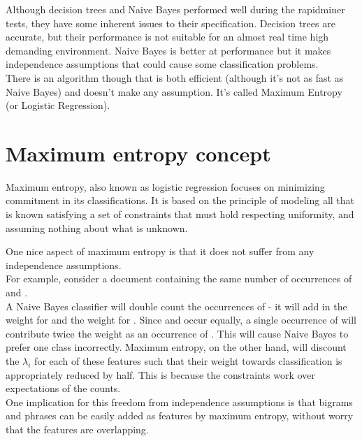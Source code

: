 Although decision trees and Naive Bayes performed well during the rapidminer tests, they have some inherent issues to their specification. Decision trees are accurate, but their performance is 
not suitable for an almost real time high demanding environment. Naive Bayes is better at performance but it makes independence assumptions that could cause some classification problems.\\
There is an algorithm though that is both efficient (although it's not as fast as Naive Bayes) and doesn't make any assumption. It's called Maximum Entropy (or Logistic Regression).

\section{Maximum entropy concept}
Maximum entropy, also known as logistic regression focuses on minimizing commitment in its classifications. It is based on the principle of modeling all that is known satisfying a set of constraints
that must hold respecting uniformity, and assuming nothing about what is unknown.

One nice aspect of maximum entropy is that it does not suffer from any independence assumptions.\\
For example, consider a document containing the same number of occurrences of  and .\\
A Naive Bayes classifier will double count the occurrences of  
- it will add in the weight for  and the weight for . Since  and
 occur equally, a single occurrence of  will contribute twice the weight as an occurrence of . This will cause Naive Bayes to prefer one class 
incorrectly.
Maximum entropy, on the other hand, will discount the $\lambda_i$ for each of these features such that their weight towards classification is appropriately reduced by half.
This is because the constraints work over expectations of the counts. \\
One implication for this freedom from independence assumptions is that bigrams and phrases can be easily added as features by maximum entropy, without worry that the features are overlapping.



